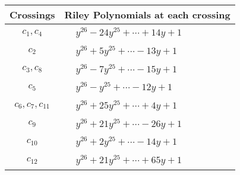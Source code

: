 \documentclass[1p]{elsarticle_modified}
\theoremstyle{definition}
\begin{document}
\begin{tabular}{m{50pt}|m{274pt}}
Crossings & \hspace{64pt}Riley Polynomials at each crossing \\
\hline $$\begin{aligned}c_{1},c_{4}\end{aligned}$$&$\begin{aligned}
&y^{26}-24 y^{25}+\cdots+14 y+1
\end{aligned}$\\
\hline $$\begin{aligned}c_{2}\end{aligned}$$&$\begin{aligned}
&y^{26}+5 y^{25}+\cdots-13 y+1
\end{aligned}$\\
\hline $$\begin{aligned}c_{3},c_{8}\end{aligned}$$&$\begin{aligned}
&y^{26}-7 y^{25}+\cdots-15 y+1
\end{aligned}$\\
\hline $$\begin{aligned}c_{5}\end{aligned}$$&$\begin{aligned}
&y^{26}- y^{25}+\cdots-12 y+1
\end{aligned}$\\
\hline $$\begin{aligned}c_{6},c_{7},c_{11}\end{aligned}$$&$\begin{aligned}
&y^{26}+25 y^{25}+\cdots+4 y+1
\end{aligned}$\\
\hline $$\begin{aligned}c_{9}\end{aligned}$$&$\begin{aligned}
&y^{26}+21 y^{25}+\cdots-26 y+1
\end{aligned}$\\
\hline $$\begin{aligned}c_{10}\end{aligned}$$&$\begin{aligned}
&y^{26}+2 y^{25}+\cdots-14 y+1
\end{aligned}$\\
\hline $$\begin{aligned}c_{12}\end{aligned}$$&$\begin{aligned}
&y^{26}+21 y^{25}+\cdots+65 y+1
\end{aligned}$\\
\hline
\end{tabular}\\~\\
\end{document}
